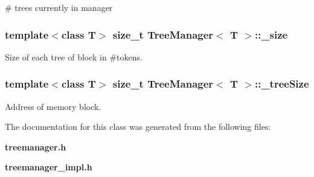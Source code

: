 \# trees currently in manager 

\subsubsection{\setlength{\rightskip}{0pt plus 5cm}template$<$class T$>$ size\_\-t {\bf Tree\-Manager}$<$ T $>$::{\bf \_\-size}\hspace{0.3cm}{\tt  [protected]}}\label{classTreeManager_p2}


Size of each tree of block in \#tokens. 

\subsubsection{\setlength{\rightskip}{0pt plus 5cm}template$<$class T$>$ size\_\-t {\bf Tree\-Manager}$<$ T $>$::{\bf \_\-tree\-Size}\hspace{0.3cm}{\tt  [protected]}}\label{classTreeManager_p1}


Address of memory block. 



The documentation for this class was generated from the following files:\begin{CompactItemize}
\item 
{\bf treemanager.h}\item 
{\bf treemanager\_\-impl.h}\end{CompactItemize}
